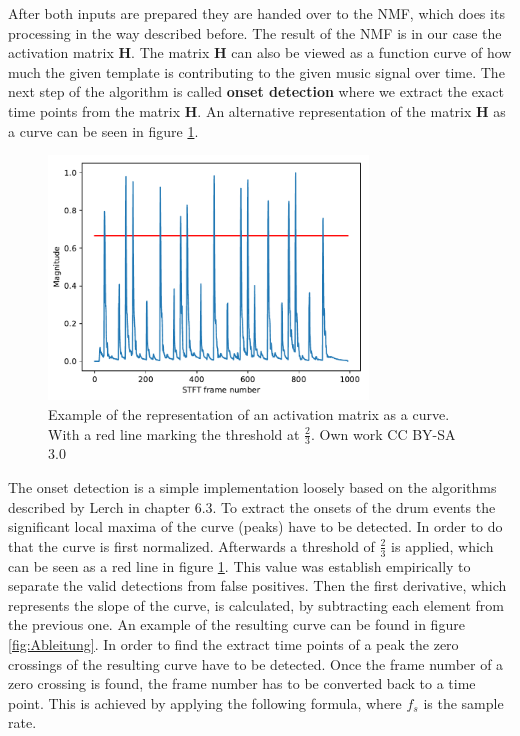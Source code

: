 \documentclass{article}
\begin{document}
After both inputs are prepared they are handed over to the NMF, which does its processing in the way described before.
The result of the NMF is in our case the activation matrix $\mathbf{H}$.
The matrix $\mathbf{H}$ can also be viewed as a function curve of how much the given template is contributing to the given music signal over time.
The next step of the algorithm is called \textbf{onset detection} where we extract the exact time points from the matrix $\mathbf{H}$.
An alternative representation of the matrix $\mathbf{H}$ as a curve can be seen in figure \ref{fig:ActivationMatrix}.
\begin{figure}[htb]

\begin{minipage}[b]{1.0\linewidth}
  \centering
  \centerline{\includegraphics[width=8.5cm]{figures/ActivationMatrix}}
  \medskip
\end{minipage}

\caption{Example of the representation of an activation matrix as a curve. With a red line marking the threshold at $\frac{2}{3}$. \scriptsize{\textsf{\textcopyright} Own work CC BY-SA 3.0}}
\label{fig:ActivationMatrix}

\end{figure}
The onset detection is a simple implementation loosely based on the algorithms described by Lerch \cite{lerch2012book} in chapter 6.3.
To extract the onsets of the drum events the significant local maxima of the curve (peaks) have to be detected.
In order to do that the curve is first normalized.
Afterwards a threshold of $\frac{2}{3}$ is applied, which can be seen as a red line in figure \ref{fig:ActivationMatrix}.
This value was establish empirically to separate the valid detections from false positives.
Then the first derivative, which represents the slope of the curve, is calculated, by subtracting each element from the previous one.
An example of the resulting curve can be found in figure \ref{fig:Ableitung}.
In order to find the extract time points of a peak the zero crossings of the resulting curve have to be detected.
Once the frame number of a zero crossing is found, the frame number has to be converted back to a time point.
This is achieved by applying the following formula, where $f_s$ is the sample rate.
\end{document}
